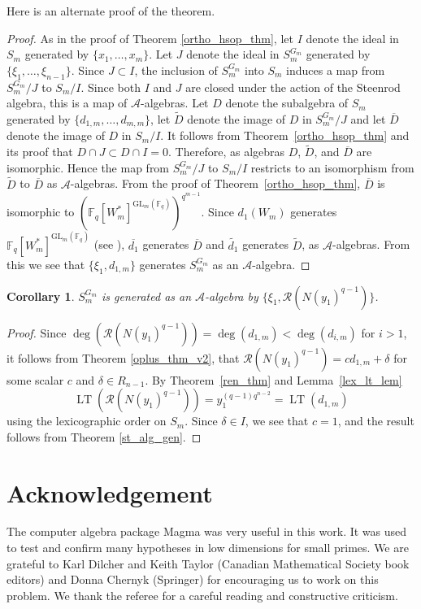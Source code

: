 \documentclass{amsart}
\newcommand{\field}{\mathbb{F}}
\newcommand{\gl}[2]{{{\text{GL}_{{#1}}(\field_{#2})}}}
\newcommand{\invring}{S_m^{G_m}}
\newcommand{\A}{\mathcal{A}}
\newcommand{\R}{\mathcal{R}}
\newtheorem{cor}[subsection]{Corollary}
\DeclareMathOperator{\lt}{LT}
\begin{document}
Here is an alternate proof of the theorem.


\begin{proof}
  As in the proof of Theorem \ref{ortho_hsop_thm}, let $I$ denote the ideal in $S_m$ generated by $\{x_1, \ldots, x_m\}$. 
  Let $J$ denote the ideal in $S_m^{G_m}$ generated by 
  $\{\xi_1, \ldots, \xi_{n-1}\}$. Since $J \subset I$, the inclusion of
  $S_m^{G_m}$ into $S_m$ induces a map from $S_m^{G_m}/J$ to $S_m/I$. Since both $I$ and $J$ are closed under the action of the Steenrod algebra, this is a map of $\A$-algebras. Let $D$ denote the subalgebra of $S_m$ generated by $\{d_{1,m},\ldots, d_{m,m}\}$, let 
  $\widetilde{D}$ denote the image of $D$ in $S_m^{G_m}/J$ and let $\overline{D}$ denote the image of $D$ in $S_m/I$. 
  It follows from Theorem~\ref{ortho_hsop_thm} and its proof that 
  $D\cap J\subset D\cap I=0$. Therefore,
  as algebras $D$, $\widetilde{D}$, and $\overline{D}$ are isomorphic. Hence the map from $S_m^{G_m}/J$ to $S_m/I$ restricts to an isomorphism from $\widetilde{D}$ to $\overline{D}$ as $\A$-algebras. 
  From the proof of Theorem~\ref{ortho_hsop_thm}, $\overline{D}$ is isomorphic to $(\field_q[W_m^*]^{\gl{m}{q}})^{q^{m-1}}$. Since $d_1(W_m)$ generates $\field_q[W_m^*]^{\gl{m}{q}}$ (see \cite{Wilkerson-primDickinva:83}), $\overline{d_1}$ generates $\overline{D}$ and $\tilde{d_1}$ generates  $\widetilde{D}$, as $\A$-algebras. 
  From this we see that $\{\xi_1, d_{1,m}\}$ generates $S_m^{G_m}$ as an $\A$-algebra.  
\end{proof}

\begin{cor} $\invring$ is generated as an $\A$-algebra by 
$\{\xi_1,\R(N(y_1)^{q-1})\}$.
\end{cor}
\begin{proof}
Since $\deg(\R(N(y_1)^{q-1}))=\deg(d_{1,m})<\deg(d_{i,m})$ for $i>1$,
it follows from Theorem \ref{oplus_thm_v2}, that 
$\R(N(y_1)^{q-1})=cd_{1,m}+\delta$ for some scalar $c$ and $\delta\in R_{n-1}$.
By Theorem~\ref{ren_thm} and Lemma~\ref{lex_lt_lem} 
$$\lt(\R(N(y_1)^{q-1}))=y_1^{(q-1)q^{n-2}}=\lt(d_{1,m})$$
using the lexicographic order on $S_m$. Since $\delta\in I$, we see that $c=1$,
and the result follows from Theorem \ref{st_alg_gen}.
\end{proof}


\section*{Acknowledgement}
  The computer algebra package Magma \cite{magma:97} was very useful in this work.  It was
used to test and confirm many hypotheses in low dimensions for small primes.
We are grateful to Karl Dilcher and Keith Taylor (Canadian Mathematical Society book editors) and Donna Chernyk (Springer) for encouraging us to work on this problem.
We thank the referee for a careful reading and constructive criticism.
\end{document}
